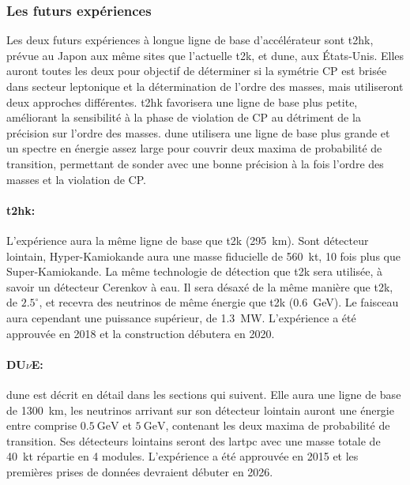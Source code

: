       \subsubsection{Les futurs expériences}

        Les deux futurs expériences à longue ligne de base d'accélérateur sont \gls{t2hk}, prévue au Japon aux même sites que l'actuelle \gls{t2k}, et \gls{dune}, aux États-Unis. %
        Elles auront toutes les deux pour objectif de déterminer si la symétrie CP est brisée dans secteur leptonique et la détermination de l'ordre des masses, mais utiliseront deux approches différentes. \gls{t2hk} favorisera une ligne de base plus petite, améliorant la sensibilité à la phase de violation de CP au détriment de la précision sur l'ordre des masses. \gls{dune} utilisera une ligne de base plus grande et un spectre en énergie assez large pour couvrir deux maxima de probabilité de transition, permettant de sonder avec une bonne précision à la fois l'ordre des masses et la violation de CP.%
        
        \paragraph{\gls{t2hk}\cite{HK2018}:} L'expérience aura la même ligne de base que \gls{t2k} (\SI{295}{\kilo\meter}). Sont détecteur lointain, Hyper-Kamiokande aura une masse fiducielle de \SI{560}{\kilo\tonne}, 10 fois plus que Super-Kamiokande. La même technologie de détection que \gls{t2k} sera utilisée, à savoir un détecteur Cerenkov à eau. Il sera désaxé de la même manière que \gls{t2k}, de $2.5^{\circ}$, et recevra des neutrinos de même énergie que \gls{t2k} (\SI{0.6}{\giga\electronvolt}). Le faisceau aura cependant une puissance supérieur, de \SI{1.3}{\mega\watt}. L'expérience a été approuvée en 2018 et la construction débutera en 2020.
        
        \paragraph{\texorpdfstring{DU$\nu$E}{DUNE}\cite{Acciarri2016}:} \gls{dune} est décrit en détail dans les sections qui suivent. Elle aura une ligne de base de \SI{1300}{\kilo\meter}, les neutrinos arrivant sur son détecteur lointain auront une énergie entre comprise $\SI{0.5}{\giga\electronvolt}$ et $\SI{5}{\giga\electronvolt}$, contenant les deux maxima de probabilité de transition. Ses détecteurs lointains seront des \gls{lartpc} avec une masse totale de \SI{40}{\kilo\tonne} répartie en 4 modules. L'expérience a été approuvée en 2015 et les premières prises de données devraient débuter en 2026.
        
